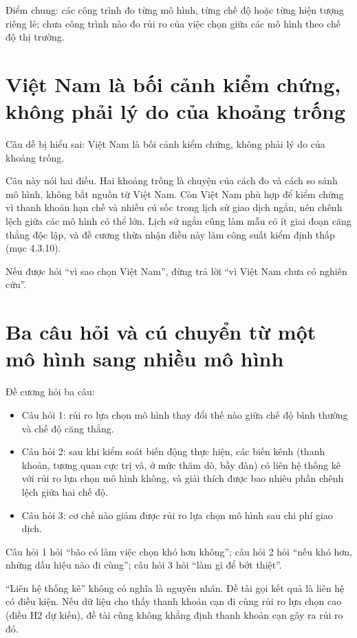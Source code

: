 Điểm chung: các công trình đo từng mô hình, từng chế độ hoặc từng hiện tượng riêng lẻ; chưa công trình nào đo rủi ro của việc chọn giữa các mô hình theo chế độ thị trường.

\section{Việt Nam là bối cảnh kiểm chứng, không phải lý do của khoảng trống}

Câu dễ bị hiểu sai: Việt Nam là bối cảnh kiểm chứng, không phải lý do của khoảng trống.

Câu này nói hai điều. Hai khoảng trống là chuyện của cách đo và cách so sánh mô hình, không bắt nguồn từ Việt Nam. Còn Việt Nam phù hợp để kiểm chứng vì thanh khoản hạn chế và nhiều cú sốc trong lịch sử giao dịch ngắn, nên chênh lệch giữa các mô hình có thể lớn. Lịch sử ngắn cũng làm mẫu có ít giai đoạn căng thẳng độc lập, và đề cương thừa nhận điều này làm công suất kiểm định thấp (mục 4.3.10).

Nếu được hỏi “vì sao chọn Việt Nam”, đừng trả lời “vì Việt Nam chưa có nghiên cứu”.

\section{Ba câu hỏi và cú chuyển từ một mô hình sang nhiều mô hình}

Đề cương hỏi ba câu:

\begin{itemize}
\item
  Câu hỏi 1: rủi ro lựa chọn mô hình thay đổi thế nào giữa chế độ bình thường và chế độ căng thẳng.
\item
  Câu hỏi 2: sau khi kiểm soát biến động thực hiện, các biến kênh (thanh khoản, tương quan cực trị và, ở mức thăm dò, bầy đàn) có liên hệ thống kê với rủi ro lựa chọn mô hình không, và giải thích được bao nhiêu phần chênh lệch giữa hai chế độ.
\item
  Câu hỏi 3: cơ chế nào giảm được rủi ro lựa chọn mô hình sau chi phí giao dịch.
\end{itemize}

Câu hỏi 1 hỏi “bão có làm việc chọn khó hơn không”; câu hỏi 2 hỏi “nếu khó hơn, những dấu hiệu nào đi cùng”; câu hỏi 3 hỏi “làm gì để bớt thiệt”.

“Liên hệ thống kê” không có nghĩa là nguyên nhân. Đề tài gọi kết quả là liên hệ có điều kiện. Nếu dữ liệu cho thấy thanh khoản cạn đi cùng rủi ro lựa chọn cao (điều H2 dự kiến), đề tài cũng không khẳng định thanh khoản cạn gây ra rủi ro đó.

